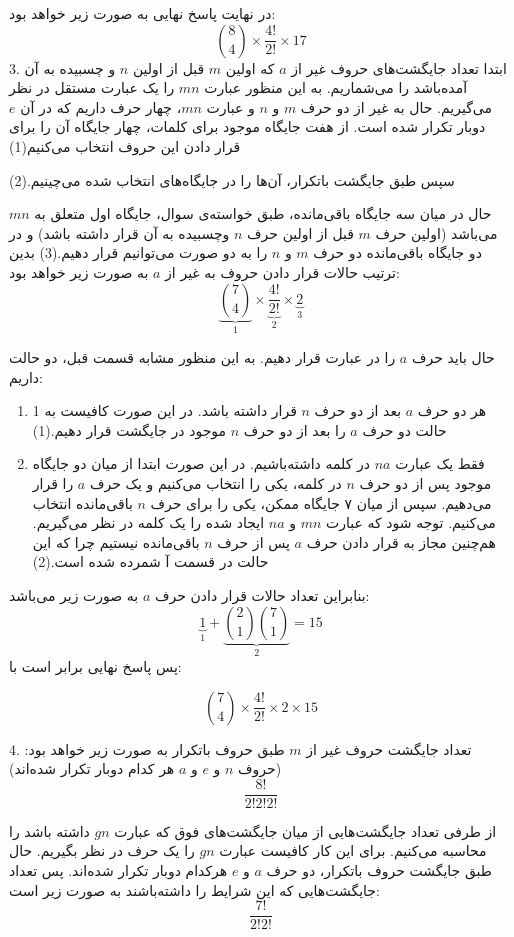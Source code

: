     در نهایت پاسخ نهایی به صورت زیر خواهد بود:
    $${8\choose 4} \times \frac{4!}{2!} \times 17$$
    3.
    \p
    ابتدا تعداد جایگشت‌های  حروف غیر از $a$ که اولین $m$ قبل از اولین $n$ و چسبیده به آن آمده‌باشد را می‌شماریم.
    به این منظور عبارت $mn$ را یک عبارت مستقل در نظر می‌گیریم.
    حال به غیر از دو حرف $m$ و $n$ و عبارت
     $mn$، 
    چهار حرف داریم که در آن $e$ دوبار تکرار شده است.
    از هفت جایگاه موجود برای کلمات، چهار جایگاه آن را برای قرار دادن این حروف انتخاب می‌کنیم(1)
    
    \p
    سپس طبق جایگشت باتکرار، آن‌ها را در جایگاه‌های انتخاب شده می‌چینیم.(2)
    
    \p
    حال در میان سه جایگاه باقی‌مانده، طبق خواسته‌ی سوال، جایگاه اول متعلق به $mn$ می‌باشد
    (اولین حرف $m$ قبل از اولین حرف $n$ وچسبیده به آن قرار داشته باشد)
    و در دو جایگاه باقی‌مانده دو حرف $m$ و $n$ را به دو صورت می‌توانیم قرار دهیم.(3)
    \p
    بدین ترتیب حالات قرار دادن حروف به غیر از $a$ به صورت زیر خواهد بود:
    $$\underbrace{{7\choose 4}}_{1} \times \underbrace{\frac{4!}{2!}}_{2} \times \underbrace{2}_{3}$$
    
    حال باید حرف $a$ را در عبارت قرار دهیم.
    به این منظور مشابه قسمت قبل، دو حالت داریم:
    \begin{enumerate}
      \item 
      \p
      هر دو حرف $a$ بعد از دو حرف $n$ قرار داشته باشد. در این صورت کافیست به 1 حالت دو حرف $a$ را بعد از دو حرف $n$ موجود در جایگشت قرار دهیم.(1)
      \item
      \p
      فقط یک عبارت $na$ در کلمه داشته‌باشیم. در این صورت ابتدا از میان دو جایگاه موجود پس از دو حرف $n$ در کلمه، یکی را انتخاب می‌کنیم و یک حرف $a$ را قرار می‌دهیم. سپس از میان ۷ جایگاه ممکن، یکی را برای حرف $n$ باقی‌مانده انتخاب می‌کنیم.
      توجه شود که عبارت $mn$ و $na$ ایجاد شده را یک کلمه‌ در نظر می‌گیریم. هم‌چنین مجاز به قرار دادن حرف $a$ پس از حرف $n$ باقی‌مانده نیستیم چرا که این حالت در قسمت آ شمرده شده است.(2)
    \end{enumerate}
    \p
    بنابراین تعداد حالات قرار دادن حرف $a$ به صورت زیر می‌باشد:
    $$\underbrace{1}_{1} + \underbrace{{2\choose 1}{7\choose 1}}_{2} = 15$$ 
    پس پاسخ نهایی برابر است با:
    
    $${7\choose 4} \times \frac{4!}{2!} \times 2 \times 15$$

    4.
    \p
    تعداد جایگشت حروف غیر از $m$
    طبق حروف باتکرار به صورت زیر خواهد بود:
    (حروف $n$ و $e$ و $a$ هر کدام دوبار تکرار شده‌اند)
    $$\frac{8!}{2!2!2!}$$
    
    از طرفی تعداد جایگشت‌هایی از میان جایگشت‌های فوق که عبارت $gn$ داشته باشد را محاسبه می‌کنیم. برای این کار کافیست عبارت $gn$ را یک حرف در نظر بگیریم. حال طبق جایگشت حروف باتکرار، دو حرف $a$ و $e$ هرکدام دوبار تکرار شده‌اند. پس تعداد جایگشت‌هایی که این شرایط را داشته‌باشند به صورت زیر است:
    $$\frac{7!}{2!2!}$$
    

